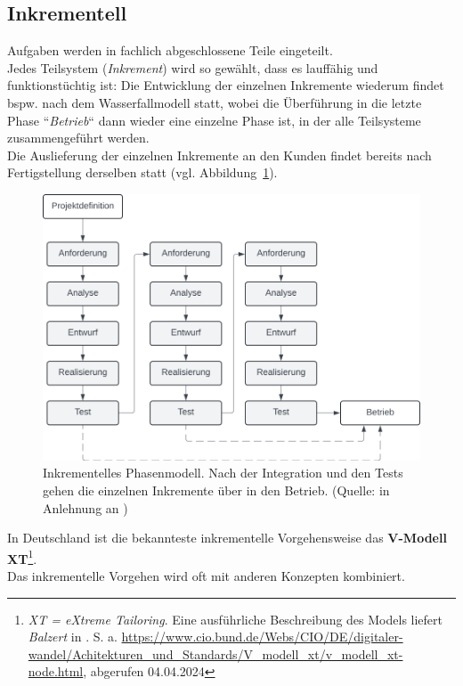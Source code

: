 
\subsection{Inkrementell}
Aufgaben werden in fachlich abgeschlossene Teile eingeteilt.\\
Jedes Teilsystem (\textit{Inkrement}) wird so gewählt, dass es lauffähig und funktionstüchtig ist: Die Entwicklung der einzelnen Inkremente wiederum findet bspw. nach dem Wasserfallmodell statt,
wobei die Überführung in die letzte Phase ``\textit{Betrieb}`` dann wieder eine einzelne Phase ist, in der alle Teilsysteme zusammengeführt werden.\\
Die Auslieferung der einzelnen Inkremente an den Kunden findet bereits nach Fertigstellung derselben statt (vgl. Abbildung~\ref{fig:inkrementell}).\\

\begin{figure}
    \centering
    \includegraphics[scale=0.4]{part one/Prozessmodelle/img/inkrementell}
    \caption{Inkrementelles Phasenmodell.
    Nach der Integration und den Tests gehen die einzelnen Inkremente über in den Betrieb.
        (Quelle: in Anlehnung an \cite[322]{AABG14n})}
    \label{fig:inkrementell}
\end{figure}

\noindent
In Deutschland ist die bekannteste inkrementelle Vorgehensweise das \textbf{V-Modell XT}\footnote{ \textit{XT = eXtreme Tailoring}.
Eine ausführliche Beschreibung des Models liefert \textit{Balzert} in \cite{Bal08}. S. a.
\url{https://www.cio.bund.de/Webs/CIO/DE/digitaler-wandel/Achitekturen_und_Standards/V_modell_xt/v_modell_xt-node.html}, abgerufen 04.04.2024
}.\\
Das inkrementelle Vorgehen wird oft mit anderen Konzepten kombiniert.

